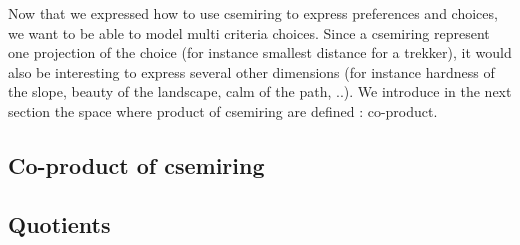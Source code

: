 



Now that we expressed how to use csemiring to express preferences and choices, we want to be able to model multi criteria choices. Since a csemiring represent one projection of the choice (for instance smallest distance for a trekker), it would also be interesting to express several other dimensions (for instance hardness of the slope, beauty of the landscape, calm of the path, ..). We introduce in the next section the space where product of csemiring are defined : co-product.

\subsection*{Co-product of csemiring}



%

\subsection*{Quotients}


%

%

%

%
